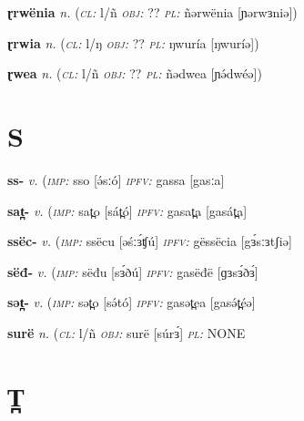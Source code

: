 \newentry
\headword\textbf{ɽrwënia}  
\ipa{[ɽrwɜniə]}
\synpos\textit{n.} 
\class(\textit{\textsc{cl:}} {l/ñ}
\object\textit{\textsc{obj:}} ??
\plural\textit{\textsc{pl:}} ñərwënia [ɲərwɜniə]) 

\newentry
\headword\textbf{ɽrwia}  
\ipa{[ɽrwíə]}
\synpos\textit{n.} 
\class(\textit{\textsc{cl:}} {l/ŋ}
\object\textit{\textsc{obj:}} ??
\plural\textit{\textsc{pl:}} ŋwuría [ŋwuríə]) 

\newentry
\headword\textbf{ɽwea}  
\ipa{[ɽwéə]}
\synpos\textit{n.} 
\class(\textit{\textsc{cl:}} {l/ñ}
\object\textit{\textsc{obj:}} ??
\plural\textit{\textsc{pl:}} ñədwea [ɲə́dwéə]) 


\section*{S}\label{S}

\newentry
\headword\textbf{ss-}  
\ipa{[sː-]}
\synpos\textit{v.} 
\imperative(\textit {\textsc{imp:}} sso [ə́sːó]
\imperfective\textit{\textsc{ipfv:}} gassa [gasːa] 


\newentry
\headword\textbf{sat̪-}  
\ipa{[sát̪-]}
\synpos\textit{v.} 
\imperative(\textit {\textsc{imp:}} sat̪o [sát̪ó]
\imperfective\textit{\textsc{ipfv:}} gasat̪a [gasát̪a] 

\newentry
\headword\textbf{ssëc-}  
\ipa{[sːɜ́ʧ-]}
\synpos\textit{v.} 
\imperative(\textit {\textsc{imp:}} ssëcu [əśːɜ́ʧú]
\imperfective\textit{\textsc{ipfv:}} gëssëcia [gɜ́sːɜtʃiə]

\newentry
\headword\textbf{sëđ-}  
\ipa{[sɜ́ð-]}
\synpos\textit{v.} 
\imperative(\textit {\textsc{imp:}} sëđu [sɜ́ðú]
\imperfective\textit{\textsc{ipfv:}} gasëđë [ɡɜsɜ́ðɜ́] 


\newentry
\headword\textbf{sət̪-}  
\ipa{[sə́t̪-]}
\synpos\textit{v.} 
\imperative(\textit {\textsc{imp:}} sət̪o [sə́tó]
\imperfective\textit{\textsc{ipfv:}} gasət̪ea [gasə́t̪éə] 

\newentry
\headword\textbf{surë}  
\ipa{[súrɜ́]}
\synpos\textit{n.} 
\class(\textit{\textsc{cl:}} {l/ñ}
\object\textit{\textsc{obj:}} surë [súrɜ́]
\plural\textit{\textsc{pl:}} NONE 


\section*{T̪}\label{T̪}

